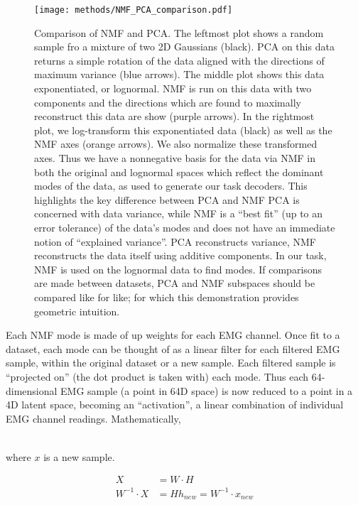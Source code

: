 \documentclass[../main.tex]{subfiles}
\begin{document}
\begin{figure}[H]%
  \centering
  \texttt{[image: methods/NMF\_PCA\_comparison.pdf]}
  \caption[Comparison of NMF and PCA]{Comparison of NMF and PCA. The leftmost plot shows a random sample fro a mixture of two 2D Gaussians (black). PCA on this data returns a simple rotation of the data aligned with the directions of maximum variance (blue arrows). The middle plot shows this data exponentiated, or lognormal. NMF is run on this data with two components and the directions which are found to maximally reconstruct this data are show (purple arrows). In the rightmost plot, we log-transform this exponentiated data (black) as well as the NMF axes (orange arrows). We also normalize these transformed axes. Thus we have a nonnegative basis for the data via NMF in both the original and lognormal spaces which reflect the dominant modes of the data, as used to generate our task decoders. This highlights the key difference between PCA and NMF\: PCA is concerned with data variance, while NMF is a ``best fit'' (up to an error tolerance) of the data's modes and does not have an immediate notion of ``explained variance''. PCA reconstructs variance, NMF reconstructs the data itself using additive components. In our task, NMF is used on the lognormal data to find modes. If comparisons are made between datasets, PCA and NMF subspaces should be compared like for like; for which this demonstration provides geometric intuition.}\label{fig:nmf_v_pca}
\end{figure}

Each NMF mode is made of up weights for each EMG channel. Once fit to a dataset, each mode can be thought of as a linear filter for each filtered EMG sample, within the original dataset or a new sample. Each filtered sample is ``projected on'' (the dot product is taken with) each mode. Thus each 64-dimensional EMG sample (a point in 64D space) is now reduced to a point in a 4D latent space, becoming an ``activation'', a linear combination of individual EMG channel readings. Mathematically, 

\begin{align}
\end{align}

where $x$ is a new sample.

\begin{align}
  X &= W\cdot{H} \\
  W^{-1}\cdot{X} &= {H}
  h_{new} = W^{-1}\cdot{x_{new}}
\end{align}
\end{document}
